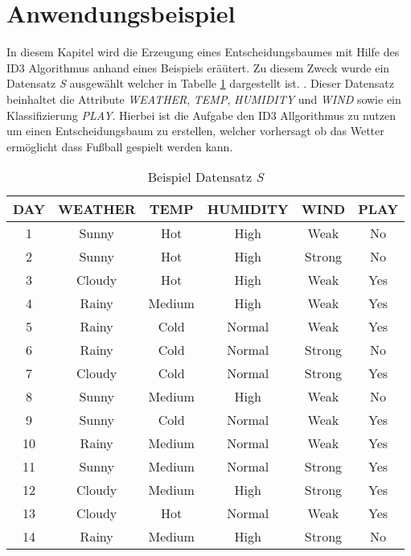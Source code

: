 \section{Anwendungsbeispiel}
\label{id3:datensatz}
In diesem Kapitel wird die Erzeugung eines Entscheidungsbaumes mit Hilfe des ID3 Algorithmus anhand eines Beispiels eräütert. Zu diesem Zweck wurde ein Datensatz \textit{S} ausgewählt welcher in Tabelle \ref{table:datensatz-original} dargestellt ist. \Autocite{ImplementationID3}. Dieser Datensatz beinhaltet die Attribute \textit{WEATHER}, \textit{TEMP}, \textit{HUMIDITY} und \textit{WIND} sowie ein Klassifizierung \textit{PLAY}. Hierbei ist die Aufgabe den ID3 Allgorithmus zu nutzen um einen Entscheidungsbaum zu erstellen, welcher vorhersagt ob das Wetter ermöglicht dass Fußball gespielt werden kann.

\begin{table}[htbp]
    \centering
    \begin{tabular}{cccccc}
        \toprule
        \textbf{DAY} & \textbf{WEATHER} & \textbf{TEMP} & \textbf{HUMIDITY} & \textbf{WIND} & \textbf{PLAY} \\
        \toprule
        1   &Sunny	&Hot	&High	&Weak	&No  \\
        2   &Sunny	&Hot	&High	&Strong	&No  \\
        3   &Cloudy	&Hot	&High	&Weak	&Yes \\
        4   &Rainy	&Medium	&High	&Weak	&Yes \\
        5   &Rainy	&Cold	&Normal	&Weak	&Yes \\
        6   &Rainy	&Cold	&Normal	&Strong	&No  \\
        7   &Cloudy	&Cold	&Normal	&Strong	&Yes \\
        8   &Sunny	&Medium	&High	&Weak	&No  \\
        9   &Sunny	&Cold	&Normal	&Weak	&Yes \\
        10  &Rainy	&Medium	&Normal	&Weak	&Yes \\
        11  &Sunny	&Medium	&Normal	&Strong	&Yes \\
        12  &Cloudy	&Medium	&High	&Strong	&Yes \\
        13  &Cloudy	&Hot	&Normal	&Weak	&Yes \\
        14  &Rainy	&Medium	&High	&Strong	&No  \\
        \bottomrule
    \end{tabular}
    \caption{Beispiel Datensatz \textit{S}}
    \label{table:datensatz-original}
\end{table}

